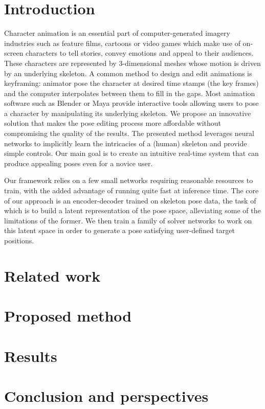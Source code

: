 \documentclass[11pt,twocolumn]{scrartcl}
\begin{document}
\section{Introduction}
Character animation is an essential part of computer-generated imagery industries such as feature films, cartoons or video games which make use of on-screen characters to tell stories, convey emotions and appeal to their audiences.
These characters are represented by 3-dimensional meshes whose motion is driven by an underlying skeleton. A common method to design and edit animations is keyframing: animator pose the character at desired time stamps (the key frames) and the computer interpolates between them to fill in the gaps.
Most animation software such as Blender or Maya provide interactive tools allowing users to pose a character by manipulating its underlying skeleton.
We propose an innovative solution that makes the pose editing process more affordable without compromising the quality of the results. The presented method leverages neural networks to implicitly learn the intricacies of a (human) skeleton and provide simple controls.
Our main goal is to create an intuitive real-time system that can produce appealing poses even for a novice user.

Our framework relies on a few small networks requiring reasonable resources to train, with the added advantage of running quite fast at inference time. The core of our approach is an encoder-decoder trained on skeleton pose data, the task of which is to build a latent representation of the pose space, alleviating some of the limitations of the former. We then train a family of solver networks to work on this latent space in order to generate a pose satisfying user-defined target positions.
\section{Related work}
\label{sect:related_work}

    
\section{Proposed method}
\label{sect:proposedMethod}

\section{Results}
\label{sect:results}


%

\section{Conclusion and perspectives}
\label{sect:conclusion}




\end{document}
